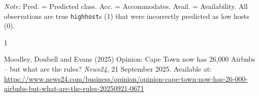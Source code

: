 \documentclass[11pt]{article}\usepackage[]{graphicx}\usepackage[]{xcolor}
\begin{document}
\FloatBarrier
\begin{table}[H]
\centering
\caption{Five Randomly Sampled False Negatives from Test Set Predictions}
\label{tab:fn_sample}
\par\smallskip
\footnotesize{\textit{Note:} Pred. = Predicted class. Acc. = Accommodates. Avail. = Availability. All observations are true \texttt{highhost}s (1) that were incorrectly predicted as low hosts (0).}
\end{table}

\begin{thebibliography}{1}

Moodley, Doubell and Evans (2025)
\newblock Opinion: Cape Town now has 26,000 Airbnbs -- but what are the rules?
\newblock \textit{News24}, 21 September 2025.
\newblock Available at: \url{https://www.news24.com/business/opinion/opinion-cape-town-now-has-26-000-airbnbs-but-what-are-the-rules-20250921-0671}

\end{thebibliography}
\end{document}
